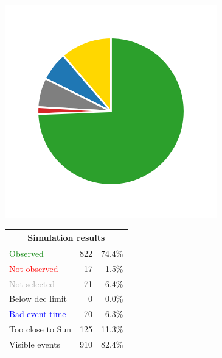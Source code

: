 \begin{colsection}
\begin{colsection}
\begin{figure}[p]
\begin{center}
\begin{minipage}[t]{0.2\textwidth}\vspace{10pt}
\includegraphics[width=\linewidth]{images/gw_sims/2n8&1s4_pie.png}
\end{minipage}
%
\begin{minipage}[t]{0.37\textwidth}\vspace{0pt}
\begin{tabular}{lrr}
\multicolumn{3}{c}{\textbf{Simulation results}} \\
\midrule
\textcolor{Green}{Observed} & 822 & 74.4\% \\
\textcolor{Red}{Not observed} & 17 & 1.5\% \\
\textcolor{darkgray}{Not selected} & 71 & 6.4\% \\
\textcolor{NavyBlue}{Below dec limit} & 0 & 0.0\% \\
\textcolor{Blue}{Bad event time} & 70 & 6.3\% \\
\textcolor{BurntOrange}{Too close to Sun} & 125 & 11.3\% \\
\midrule
Visible events & 910 &  82.4\% \\
\end{tabular}
\end{minipage}
%
\begin{minipage}[t]{0.35\textwidth}\vspace{0pt}

\end{minipage}
\end{center}
\end{figure}
\end{colsection}
\end{colsection}
